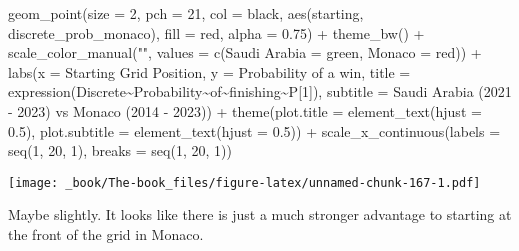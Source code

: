 \documentclass[
]{book}
\newenvironment{Shaded}{\begin{snugshade}}{\end{snugshade}}
\newcommand{\AttributeTok}[1]{\textcolor[rgb]{0.77,0.63,0.00}{#1}}
\newcommand{\DecValTok}[1]{\textcolor[rgb]{0.00,0.00,0.81}{#1}}
\newcommand{\FloatTok}[1]{\textcolor[rgb]{0.00,0.00,0.81}{#1}}
\newcommand{\FunctionTok}[1]{\textcolor[rgb]{0.00,0.00,0.00}{#1}}
\newcommand{\NormalTok}[1]{#1}
\newcommand{\OtherTok}[1]{\textcolor[rgb]{0.56,0.35,0.01}{#1}}
\newcommand{\SpecialCharTok}[1]{\textcolor[rgb]{0.00,0.00,0.00}{#1}}
\newcommand{\StringTok}[1]{\textcolor[rgb]{0.31,0.60,0.02}{#1}}
\begin{document}
\begin{Shaded}
\begin{Highlighting}[]
  \FunctionTok{geom\_point}\NormalTok{(}\AttributeTok{size =} \DecValTok{2}\NormalTok{, }\AttributeTok{pch =} \DecValTok{21}\NormalTok{, }\AttributeTok{col =} \StringTok{\textquotesingle{}black\textquotesingle{}}\NormalTok{, }\FunctionTok{aes}\NormalTok{(starting, discrete\_prob\_monaco), }\AttributeTok{fill =} \StringTok{\textquotesingle{}red\textquotesingle{}}\NormalTok{, }\AttributeTok{alpha =} \FloatTok{0.75}\NormalTok{) }\SpecialCharTok{+}
  \FunctionTok{theme\_bw}\NormalTok{() }\SpecialCharTok{+}
  \FunctionTok{scale\_color\_manual}\NormalTok{(}\StringTok{""}\NormalTok{, }\AttributeTok{values =} \FunctionTok{c}\NormalTok{(}\StringTok{\textquotesingle{}Saudi Arabia\textquotesingle{}} \OtherTok{=} \StringTok{\textquotesingle{}green\textquotesingle{}}\NormalTok{, }\StringTok{\textquotesingle{}Monaco\textquotesingle{}} \OtherTok{=} \StringTok{\textquotesingle{}red\textquotesingle{}}\NormalTok{)) }\SpecialCharTok{+}
  \FunctionTok{labs}\NormalTok{(}\AttributeTok{x =} \StringTok{\textquotesingle{}Starting Grid Position\textquotesingle{}}\NormalTok{,}
       \AttributeTok{y =} \StringTok{\textquotesingle{}Probability of a win\textquotesingle{}}\NormalTok{,}
       \AttributeTok{title =} \FunctionTok{expression}\NormalTok{(Discrete}\SpecialCharTok{\textasciitilde{}}\NormalTok{Probability}\SpecialCharTok{\textasciitilde{}}\NormalTok{of}\SpecialCharTok{\textasciitilde{}}\NormalTok{finishing}\SpecialCharTok{\textasciitilde{}}\NormalTok{P[}\DecValTok{1}\NormalTok{]),}
       \AttributeTok{subtitle =} \StringTok{\textquotesingle{}Saudi Arabia (2021 {-} 2023) vs Monaco (2014 {-} 2023)\textquotesingle{}}\NormalTok{) }\SpecialCharTok{+}
  \FunctionTok{theme}\NormalTok{(}\AttributeTok{plot.title =} \FunctionTok{element\_text}\NormalTok{(}\AttributeTok{hjust =} \FloatTok{0.5}\NormalTok{),}
        \AttributeTok{plot.subtitle =} \FunctionTok{element\_text}\NormalTok{(}\AttributeTok{hjust =} \FloatTok{0.5}\NormalTok{)) }\SpecialCharTok{+}
  \FunctionTok{scale\_x\_continuous}\NormalTok{(}\AttributeTok{labels =} \FunctionTok{seq}\NormalTok{(}\DecValTok{1}\NormalTok{, }\DecValTok{20}\NormalTok{, }\DecValTok{1}\NormalTok{),}
                     \AttributeTok{breaks =} \FunctionTok{seq}\NormalTok{(}\DecValTok{1}\NormalTok{, }\DecValTok{20}\NormalTok{, }\DecValTok{1}\NormalTok{))}
\end{Highlighting}
\end{Shaded}

\texttt{[image: \_book/The-book\_files/figure-latex/unnamed-chunk-167-1.pdf]}

Maybe slightly. It looks like there is just a much stronger advantage to starting at the front of the grid in Monaco.
\end{document}
